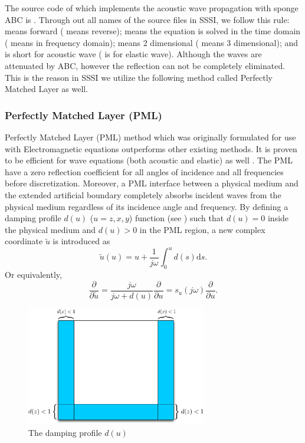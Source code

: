 \documentclass[11pt]{article}
\theoremstyle{plain}
\theoremstyle{definition}
\theoremstyle{remark}
\numberwithin{equation}{section}
\begin{document}
The source code of which implements the acoustic wave propagation with sponge ABC 
is . Through out all names of the source files in SSSI,  we follow this rule:  means forward ( means reverse);  means the equation is solved in the time domain ( means in frequency domain);  means 2 dimensional ( means 3 dimensional); and  is short
 for acoustic wave ( is for elastic wave).  Although the waves are attenuated by ABC, however the reflection can not be completely eliminated. This is the reason in SSSI we utilize the following method called Perfectly Matched Layer as well. 



\subsubsection{Perfectly Matched Layer (PML)}
 Perfectly Matched Layer (PML) method which was originally formulated for use with Electromagnetic equations outperforms other existing methods. It is proven to be efficient for wave equations (both acoustic and elastic) as well \cite{KomMar2007}. The PML have a zero reflection coefficient for all angles of incidence and all frequencies before discretization. Moreover, a PML interface between a physical medium and the extended artificial boundary completely absorbs incident waves from the physical medium regardless of its incidence angle and frequency.
By defining a damping profile $d(u)$ ($u=z, x, y$) function (see ) such that $d(u) = 0$ inside the physical medium and $d(u) > 0$ in the PML region, a new complex coordinate $\tilde{u}$ is introduced as
  \begin{equation}\label{replace}
  \tilde{u}(u) = u + \frac{1}{j\omega}\int_0^u d(s)\mathrm{d}s.
  \end{equation}
Or equivalently,
  \begin{equation}
  \frac{\partial}{\partial \tilde{u}} = \frac{j\omega}{j\omega + d(u)}\frac{\partial}{\partial u} = s_u(j\omega)\frac{\partial}{\partial u}.
  \end{equation} 
  
\begin{figure}
\centering
\includegraphics[width=0.7\textwidth]{Fig/SpongeABC.pdf}
\caption{The damping profile $d(u)$}
\end{figure}
\end{document}
